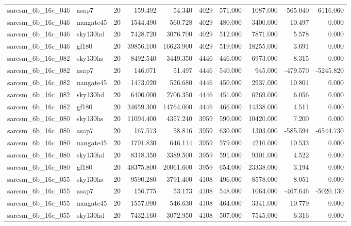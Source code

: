 \begin{tabular}{llrrrrrrrr}
sarcsm\_6b\_16c\_046 & asap7 & 20 & 159.492 & 54.340 & 4029 & 571.000 & 1087.000 & -565.040 & -6116.060 \\
sarcsm\_6b\_16c\_046 & nangate45 & 20 & 1544.490 & 560.728 & 4029 & 480.000 & 3400.000 & 10.497 & 0.000 \\
sarcsm\_6b\_16c\_046 & sky130hd & 20 & 7428.720 & 3076.700 & 4029 & 512.000 & 7871.000 & 5.578 & 0.000 \\
sarcsm\_6b\_16c\_046 & gf180 & 20 & 39856.100 & 16623.900 & 4029 & 519.000 & 18255.000 & 3.691 & 0.000 \\
sarcsm\_6b\_16c\_082 & sky130hs & 20 & 8492.540 & 3449.350 & 4446 & 446.000 & 6973.000 & 8.315 & 0.000 \\
sarcsm\_6b\_16c\_082 & asap7 & 20 & 146.071 & 51.497 & 4446 & 540.000 & 945.000 & -479.570 & -5245.820 \\
sarcsm\_6b\_16c\_082 & nangate45 & 20 & 1473.020 & 526.680 & 4446 & 450.000 & 2937.000 & 10.801 & 0.000 \\
sarcsm\_6b\_16c\_082 & sky130hd & 20 & 6400.000 & 2706.350 & 4446 & 451.000 & 6269.000 & 6.056 & 0.000 \\
sarcsm\_6b\_16c\_082 & gf180 & 20 & 34659.300 & 14764.000 & 4446 & 466.000 & 14338.000 & 4.511 & 0.000 \\
sarcsm\_6b\_16c\_080 & sky130hs & 20 & 11094.400 & 4357.240 & 3959 & 590.000 & 10420.000 & 7.200 & 0.000 \\
sarcsm\_6b\_16c\_080 & asap7 & 20 & 167.573 & 58.816 & 3959 & 630.000 & 1303.000 & -585.594 & -6544.730 \\
sarcsm\_6b\_16c\_080 & nangate45 & 20 & 1791.830 & 646.114 & 3959 & 579.000 & 4210.000 & 10.533 & 0.000 \\
sarcsm\_6b\_16c\_080 & sky130hd & 20 & 8318.350 & 3389.500 & 3959 & 591.000 & 9301.000 & 4.522 & 0.000 \\
sarcsm\_6b\_16c\_080 & gf180 & 20 & 48375.800 & 20061.600 & 3959 & 654.000 & 23338.000 & 3.194 & 0.000 \\
sarcsm\_6b\_16c\_055 & sky130hs & 20 & 9590.280 & 3791.400 & 4108 & 496.000 & 8578.000 & 8.051 & 0.000 \\
sarcsm\_6b\_16c\_055 & asap7 & 20 & 156.775 & 53.173 & 4108 & 548.000 & 1064.000 & -467.646 & -5020.130 \\
sarcsm\_6b\_16c\_055 & nangate45 & 20 & 1557.090 & 546.630 & 4108 & 464.000 & 3341.000 & 10.779 & 0.000 \\
sarcsm\_6b\_16c\_055 & sky130hd & 20 & 7432.160 & 3072.950 & 4108 & 507.000 & 7545.000 & 6.316 & 0.000 \\

\end{tabular}
